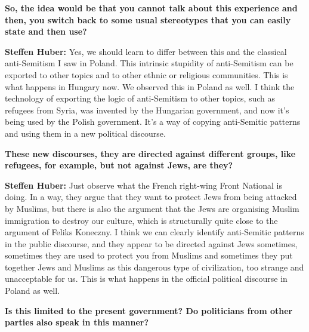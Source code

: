 \textbf{So, the idea would be that you cannot talk about this experience and then, you switch back to some usual stereotypes that you can easily state and then use?} 

\textbf{Steffen Huber:} Yes, we should learn to differ between this and the classical anti-Semitism I saw in Poland. This intrinsic stupidity of anti-Semitism can be exported to other topics and to other ethnic or religious communities. This is what happens in Hungary now. We observed this in Poland as well. I think the technology of exporting the logic of anti-Semitism to other topics, such as refugees from Syria, was invented by the Hungarian government, and now it's being used by the Polish government. It’s a way of copying anti-Semitic patterns and using them in a new political discourse. 

\textbf{These new discourses, they are directed against different groups, like refugees, for example, but not against Jews, are they?}  

\textbf{Steffen Huber:} Just observe what the French right-wing Front National is doing. In a way, they argue that they want to protect Jews from being attacked by Muslims, but there is also the argument that the Jews are organising Muslim immigration to destroy our culture, which is structurally quite close to the argument of Feliks Koneczny. I think we can clearly identify anti-Semitic patterns in the public discourse, and they appear to be directed against Jews sometimes, sometimes they are used to protect you from Muslims and sometimes they put together Jews and Muslims as this dangerous type of civilization, too strange and unacceptable for us. This is what happens in the official political discourse in Poland as well. 

\textbf{Is this limited to the present government? Do politicians from other parties also speak in this manner?} 

